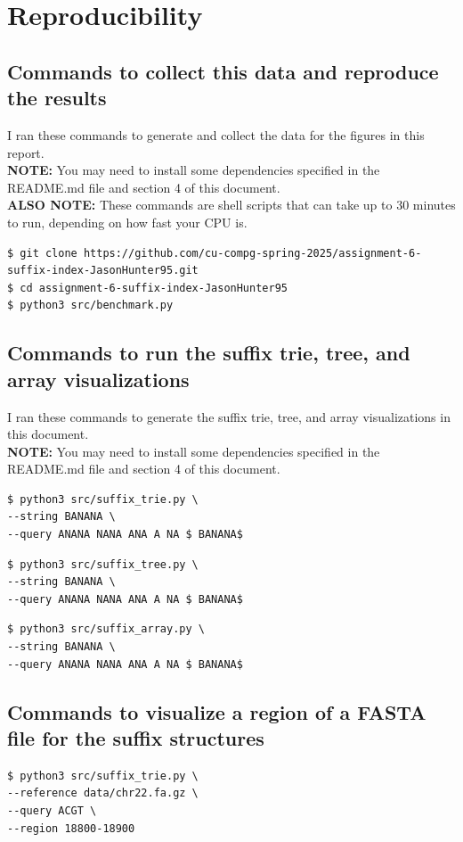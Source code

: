 \documentclass[11pt, letterpaper]{article}
\begin{document}
\newpage

\section{Reproducibility}
\subsection{Commands to collect this data and reproduce the results}
I ran these commands to generate and collect the data for the figures in this report. \\
\textbf{NOTE:} You may need to install some dependencies specified in the README.md file and section 4 of this document. \\
\textbf{ALSO NOTE:} These commands are shell scripts that can take up to 30 minutes to run, 
depending on how fast your CPU is.
\begin{verbatim}
$ git clone https://github.com/cu-compg-spring-2025/assignment-6-suffix-index-JasonHunter95.git
$ cd assignment-6-suffix-index-JasonHunter95
$ python3 src/benchmark.py
\end{verbatim}

\subsection{Commands to run the suffix trie, tree, and array visualizations}
I ran these commands to generate the suffix trie, tree, and array visualizations in this document. \\
\textbf{NOTE:} You may need to install some dependencies specified in the README.md file and section 4 of this document. \
\begin{verbatim}
$ python3 src/suffix_trie.py \
--string BANANA \
--query ANANA NANA ANA A NA $ BANANA$
\end{verbatim}

\begin{verbatim}
$ python3 src/suffix_tree.py \
--string BANANA \
--query ANANA NANA ANA A NA $ BANANA$
\end{verbatim}

\begin{verbatim}
$ python3 src/suffix_array.py \
--string BANANA \
--query ANANA NANA ANA A NA $ BANANA$
\end{verbatim}

\subsection{Commands to visualize a region of a FASTA file for the suffix structures}
\begin{verbatim}
$ python3 src/suffix_trie.py \
--reference data/chr22.fa.gz \
--query ACGT \
--region 18800-18900
\end{verbatim}
\end{document}
